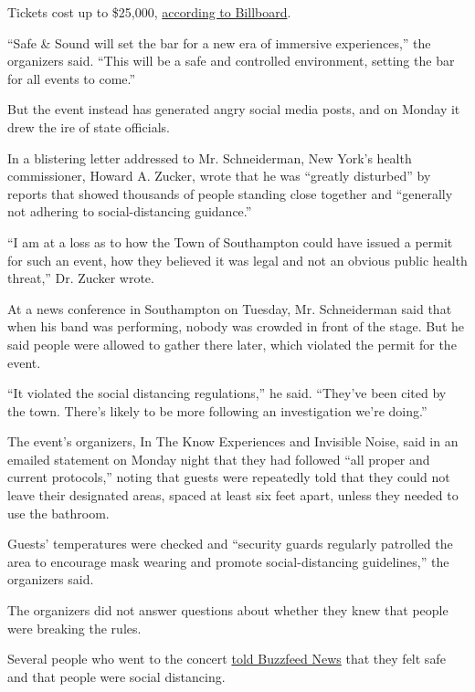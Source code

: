 Tickets cost up to \$25,000,
\href{https://www.billboard.com/articles/news/dance/9418214/the-chainsmokers-drive-in-concert-everything-we-know}{according
to Billboard}.

``Safe \& Sound will set the bar for a new era of immersive
experiences,'' the organizers said. ``This will be a safe and controlled
environment, setting the bar for all events to come.''

But the event instead has generated angry social media posts, and on
Monday it drew the ire of state officials.

In a blistering letter addressed to Mr. Schneiderman, New York's health
commissioner, Howard A. Zucker, wrote that he was ``greatly disturbed''
by reports that showed thousands of people standing close together and
``generally not adhering to social-distancing guidance.''

``I am at a loss as to how the Town of Southampton could have issued a
permit for such an event, how they believed it was legal and not an
obvious public health threat,'' Dr. Zucker wrote.

At a news conference in Southampton on Tuesday, Mr. Schneiderman said
that when his band was performing, nobody was crowded in front of the
stage. But he said people were allowed to gather there later, which
violated the permit for the event.

``It violated the social distancing regulations,'' he said. ``They've
been cited by the town. There's likely to be more following an
investigation we're doing.''

The event's organizers, In The Know Experiences and Invisible Noise,
said in an emailed statement on Monday night that they had followed
``all proper and current protocols,'' noting that guests were repeatedly
told that they could not leave their designated areas, spaced at least
six feet apart, unless they needed to use the bathroom.

Guests' temperatures were checked and ``security guards regularly
patrolled the area to encourage mask wearing and promote
social-distancing guidelines,'' the organizers said.

The organizers did not answer questions about whether they knew that
people were breaking the rules.

Several people who went to the concert
\href{https://www.buzzfeednews.com/article/tanyachen/massive-chainsmokers-concert-during-covid-draws-backlash}{told
Buzzfeed News} that they felt safe and that people were social
distancing.

